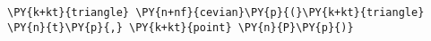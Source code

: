 \begin{Verbatim}[commandchars=\\\{\}]
    \PY{k+kt}{triangle} \PY{n+nf}{cevian}\PY{p}{(}\PY{k+kt}{triangle} \PY{n}{t}\PY{p}{,} \PY{k+kt}{point} \PY{n}{P}\PY{p}{)}
\end{Verbatim}
